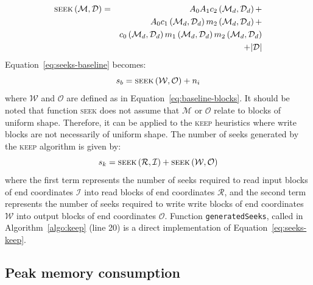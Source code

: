 \documentclass[sigconf, nonacm]{acmart}
\newcommand{\keep}[0]{\textsc{keep}\xspace}
\begin{document}
\begin{eqnarray*}
  \textsc{seek} \left(  \mathcal{M}, \mathcal{D} \right) &=&  A_0 A_1 c_2\left(\mathcal{M}_d, \mathcal{D}_d\right) + \\
                                                         &&  A_0 c_1\left(\mathcal{M}_d, \mathcal{D}_d\right) m_2\left(\mathcal{M}_d, \mathcal{D}_d\right) +\\
                                                         && c_0\left(\mathcal{M}_d, \mathcal{D}_d\right) m_1\left(\mathcal{M}_d, \mathcal{D}_d\right) m_2\left(\mathcal{M}_d, \mathcal{D}_d \right)\\
                                                         && + \vert \mathcal{D} \vert
\end{eqnarray*}
Equation~\ref{eq:seeks-baseline} becomes:
\[
  s_b = \textsc{seek} \left( \mathcal{W}, \mathcal{O} \right) + n_i
\]
where $\mathcal{W}$ and $\mathcal{O}$ are defined as in
Equation~\ref{eq:baseline-blocks}. It should be noted that function
\textsc{seek} does not assume that $\mathcal{M}$ or $\mathcal{O}$ relate to
blocks of uniform shape. Therefore, it can be applied to the \keep
heuristics where write blocks are not necessarily of uniform shape.
The number of seeks generated by the \keep algorithm is given by:
\begin{equation}
  s_k = \textsc{seek} \left(  \mathcal{R}, \mathcal{I} \right) + \textsc{seek} \left( \mathcal{W}, \mathcal{O} \right) \label{eq:seeks-keep}
\end{equation}
where the first term represents the number of seeks required to read input
 blocks of end coordinates $\mathcal{I}$ into read blocks of end
 coordinates $\mathcal{R}$, and the second term represents the number of
 seeks required to write write blocks of end coordinates $\mathcal{W}$ into
 output blocks of end coordinates $\mathcal{O}$. Function
 \texttt{generatedSeeks}, called in Algorithm~\ref{algo:keep} (line 20) is
 a direct implementation of Equation~\ref{eq:seeks-keep}.


  \subsection{Peak memory consumption}
  
\end{document}
